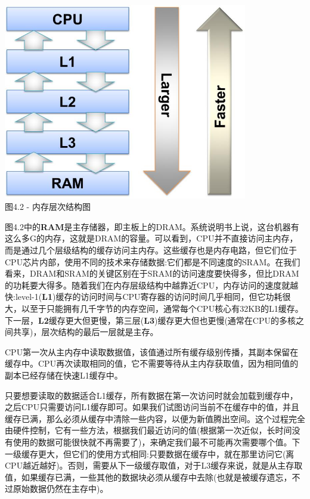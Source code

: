 \begin{center}
\includegraphics[width=0.8\textwidth]{content/1/chapter4/images/2.jpg}\\
图4.2 - 内存层次结构图
\end{center}

图4.2中的\textbf{RAM}是主存储器，即主板上的DRAM。系统说明书上说，这台机器有这么多G的内存，这就是DRAM的容量。可以看到，CPU并不直接访问主内存，而是通过几个层级结构的缓存访问主内存。这些缓存也是内存电路，但它们位于CPU芯片内部，使用不同的技术来存储数据:它们都是不同速度的SRAM。在我们看来，DRAM和SRAM的关键区别在于SRAM的访问速度要快得多，但比DRAM的功耗要大得多。随着我们在内存层级结构中越靠近CPU，内存访问的速度就越快:level-1(\textbf{L1})缓存的访问时间与CPU寄存器的访问时间几乎相同，但它功耗很大，以至于只能拥有几千字节的内存空间，通常每个CPU核心有32KB的L1缓存。下一层，\textbf{L2}缓存更大但更慢，第三层(\textbf{L3})缓存更大但也更慢(通常在CPU的多核之间共享)，层次结构的最后一层就是主存。

CPU第一次从主内存中读取数据值，该值通过所有缓存级别传播，其副本保留在缓存中。CPU再次读取相同的值，它不需要等待从主内存获取值，因为相同值的副本已经存储在快速L1缓存中。

只要想要读取的数据适合L1缓存，所有数据在第一次访问时就会加载到缓存中，之后CPU只需要访问L1缓存即可。如果我们试图访问当前不在缓存中的值，并且缓存已满，那么必须从缓存中清除一些内容，以便为新值腾出空间。这个过程完全由硬件控制，它有一些方法，根据我们最近访问的值(根据第一次近似，长时间没有使用的数据可能很快就不再需要了)，来确定我们最不可能再次需要哪个值。下一级缓存更大，但它们的使用方式相同:只要数据在缓存中，就在那里访问它(离CPU越近越好)。否则，需要从下一级缓存取值，对于L3缓存来说，就是从主存取值，如果缓存已满，一些其他的数据块必须从缓存中去除(也就是被缓存遗忘，不过原始数据仍然在主存中)。

